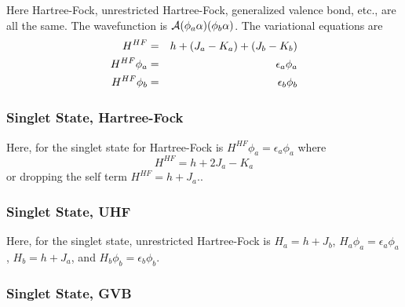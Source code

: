 Here Hartree-Fock, unrestricted Hartree-Fock, generalized valence
bond, etc., are all the same.  The wavefunction is ${\cal A} ( \phi_a 
\alpha ) ( \phi_b \alpha )$.  The variational equations are
\begin{eqnarray}
H^{HF} &=& h + \left( J_a - K_a \right) + \left( J_b - K_b \right)\cr
H^{HF} \phi_a &=& \epsilon_a \phi_a\cr
H^{HF} \phi_b &=& \epsilon_b \phi_b
\end{eqnarray}

\subsubsection{Singlet State, Hartree-Fock}

Here, for the singlet state for Hartree-Fock is 
$H^{HF} \phi_a = \epsilon_a \phi_a$ where
\begin{equation}
H^{HF} = h + 2 J_a - K_a
\label{chap15-eqno40}
\end{equation}
or dropping the self term $H^{HF} = h + J_a.$.

\subsubsection{Singlet State, UHF}

Here, for the singlet state, unrestricted Hartree-Fock is
$H_a = h + J_b$, $H_a \phi_a = \epsilon_a \phi_a$, $H_b = h + J_a$, 
and $H_b \phi_b = \epsilon_b \phi_b$.

\subsubsection{Singlet State, GVB}

